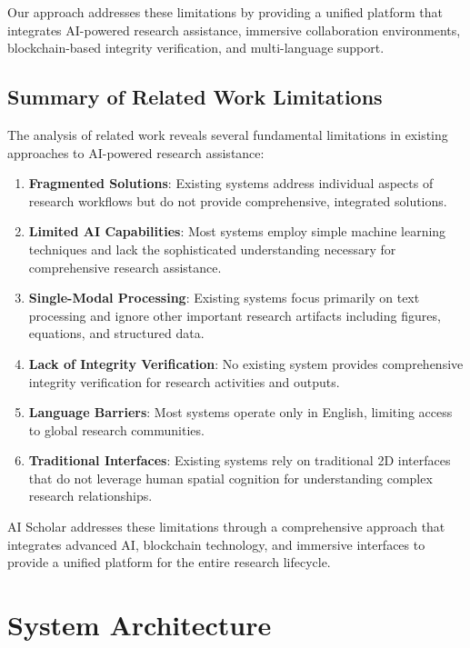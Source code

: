 \documentclass[10pt,twocolumn]{article}
\begin{document}
Our approach addresses these limitations by providing a unified platform that integrates AI-powered research assistance, immersive collaboration environments, blockchain-based integrity verification, and multi-language support.

\subsection{Summary of Related Work Limitations}

The analysis of related work reveals several fundamental limitations in existing approaches to AI-powered research assistance:

\begin{enumerate}
    \item \textbf{Fragmented Solutions}: Existing systems address individual aspects of research workflows but do not provide comprehensive, integrated solutions.
    
    \item \textbf{Limited AI Capabilities}: Most systems employ simple machine learning techniques and lack the sophisticated understanding necessary for comprehensive research assistance.
    
    \item \textbf{Single-Modal Processing}: Existing systems focus primarily on text processing and ignore other important research artifacts including figures, equations, and structured data.
    
    \item \textbf{Lack of Integrity Verification}: No existing system provides comprehensive integrity verification for research activities and outputs.
    
    \item \textbf{Language Barriers}: Most systems operate only in English, limiting access to global research communities.
    
    \item \textbf{Traditional Interfaces}: Existing systems rely on traditional 2D interfaces that do not leverage human spatial cognition for understanding complex research relationships.
\end{enumerate}

AI Scholar addresses these limitations through a comprehensive approach that integrates advanced AI, blockchain technology, and immersive interfaces to provide a unified platform for the entire research lifecycle.

\section{System Architecture}
\end{document}
